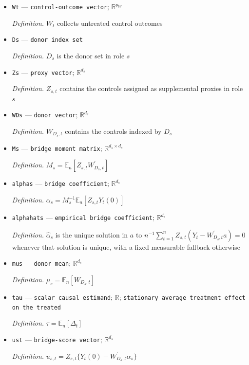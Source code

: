 \documentclass{article}
\begin{document}
\begin{itemize}
  \item \texttt{Wt} --- \texttt{control-\allowbreak{}outcome vector}; \(\mathbb R^{p_W}\)
  \par\smallskip\noindent\emph{Definition.} \(W_t\) collects untreated control outcomes
  \item \texttt{Ds} --- \texttt{donor index set}
  \par\smallskip\noindent\emph{Definition.} \(D_s\) is the donor set in role \(s\)
  \item \texttt{Zs} --- \texttt{proxy vector}; \(\mathbb R^{d_s}\)
  \par\smallskip\noindent\emph{Definition.} \(Z_{s,t}\) contains the controls assigned as supplemental proxies in role \(s\)
  \item \texttt{WDs} --- \texttt{donor vector}; \(\mathbb R^{d_s}\)
  \par\smallskip\noindent\emph{Definition.} \(W_{D_s,t}\) contains the controls indexed by \(D_s\)
  \item \texttt{Ms} --- \texttt{bridge moment matrix}; \(\mathbb R^{d_s\times d_s}\)
  \par\smallskip\noindent\emph{Definition.} \(M_s=\mathbb E_n[Z_{s,t}W_{D_s,t}^{\prime}]\)
  \item \texttt{alphas} --- \texttt{bridge coefficient}; \(\mathbb R^{d_s}\)
  \par\smallskip\noindent\emph{Definition.} \(\alpha_s=M_s^{-1}\mathbb E_n[Z_{s,t}Y_t(0)]\)
  \item \texttt{alphahats} --- \texttt{empirical bridge coefficient}; \(\mathbb R^{d_s}\)
  \par\smallskip\noindent\emph{Definition.} \(\widehat\alpha_s\) is the unique solution in \(a\) to \(n^{-1}\sum_{t=1}^n Z_{s,t}(Y_t-W_{D_s,t}^{\prime}a)=0\) whenever that solution is unique, with a fixed measurable fallback otherwise
  \item \texttt{mus} --- \texttt{donor mean}; \(\mathbb R^{d_s}\)
  \par\smallskip\noindent\emph{Definition.} \(\mu_s=\mathbb E_n[W_{D_s,t}]\)
  \item \texttt{tau} --- \texttt{scalar causal estimand}; \(\mathbb R\); \texttt{stationary average treatment effect on the treated}
  \par\smallskip\noindent\emph{Definition.} \(\tau=\mathbb E_n[\Delta_t]\)
  \item \texttt{ust} --- \texttt{bridge-\allowbreak{}score vector}; \(\mathbb R^{d_s}\)
  \par\smallskip\noindent\emph{Definition.} \(u_{s,t}=Z_{s,t}\{Y_t(0)-W_{D_s,t}^{\prime}\alpha_s\}\)

\end{itemize}
\end{document}
